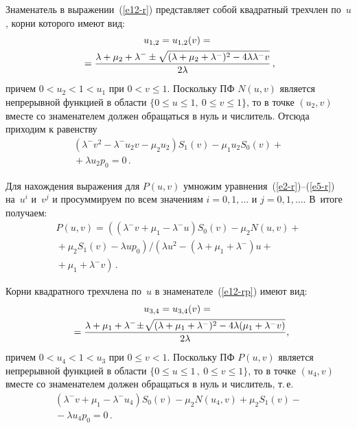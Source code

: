 \begin{multicols}{2}
Знаменатель в выражении~(\ref{e12-r}) представляет собой квадратный
трехчлен по~$u$, корни которого имеют вид:
\begin{multline*}
u_{1,2}=u_{1,2}(v)={}\\
{}=\displaystyle\frac{\displaystyle \lambda + \mu_2 + \lambda^-
\pm
\sqrt{(\lambda + \mu_2 + \lambda^-)^2-4\lambda \lambda^- v}
\mathstrut}{\displaystyle 2 \lambda\mathstrut}\,,
\end{multline*}
причем $0<u_2<1<u_1$ при $0<v\le 1$. Поскольку ПФ $N(u,v)$ является непрерывной
функцией в области $\{0\le u \le 1,\ 0\le v \le 1\}$, то в точке $(u_2,v)$ вместе
со знаменателем должен обращаться в нуль и числитель. Отсюда приходим к равенству
\begin{multline}
\label{e14-r}
(\lambda^- v^2 - \lambda^- u_2 v -  \mu_2 u_2 )
S_1(v)-\mu_1 u_2 S_0(v)+ {}\\
{}+\lambda u_2 p_0 =0\,.
\end{multline}

Для нахождения выражения для $P(u,v)$ умножим уравнения~(\ref{e2-r})--(\ref{e5-r})
на~$u^i$ и~$v^j$ и просуммируем по всем значениям $i=0,1,\dots$ и $j=0,1,\dots$.
В~итоге получаем:
\begin{multline}
\label{e12-rp}
P(u,v)=\left((\lambda^- v + \mu_1 - \lambda^- u )
S_0(v) -\mu_2 N(u,v)
+{}\right.\\
\left.{}+\mu_2 S_1(v) -  \lambda u p_0\right)\Big /\left(
\lambda u^2 - (\lambda + \mu_1 + \lambda^-)u +{}\right.\\
\left.{}+ \mu_1 + \lambda^- v\right)\,.
\end{multline}

Корни квадратного трехчлена по~$u$ в знаменателе~(\ref{e12-rp})
имеют вид:
\begin{multline*}
u_{3,4}=u_{3,4}(v)={}\\
\!{}=\displaystyle\frac{\displaystyle \lambda + \mu_1 + \lambda^-\!\pm\!\sqrt{(\lambda + \mu_1 + \lambda^-)^2-4\lambda 
(\mu_1+\lambda^- v)}\mathstrut}{\displaystyle 2 \lambda\mathstrut},\hspace*{-5pt}
\end{multline*}
причем $0<u_4<1<u_3$ при $0\le v < 1$. Поскольку ПФ $P(u,v)$ является непрерывной
функцией в области $\{0\le u \le 1\,,\ 0\le v \le 1\}$, то в точке $(u_4,v)$ вместе
со знаменателем должен обращаться в нуль и числитель, т.\,е.\
\begin{multline*}
(\lambda^- v + \mu_1 - \lambda^- u_4 )S_0(v)
-\mu_2 N(u_4,v)+\mu_2 S_1(v) - {}\\
{}- \lambda u_4 p_0 =0\,.
\end{multline*}


\end{multicols}
